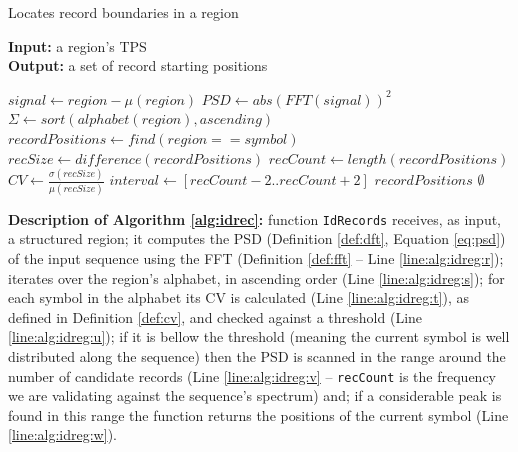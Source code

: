 \vspace{-0.3cm}

\begin{small}
\begin{algorithm}
\caption{\small{Locates record boundaries in a region}}
\label{alg:idrec}
\begin{flushleft}
\textbf{Input:} a region's TPS \\
\textbf{Output:} a set of record starting positions
\end{flushleft}

\begin{algorithmic}[1]

\State $signal \leftarrow region-\mu(region)$ 
\State $PSD \leftarrow abs(FFT(signal))^2$\label{line:alg:idreg:r}
\State $\Sigma \leftarrow sort(alphabet(region), ascending)$
\label{line:alg:idreg:s}
\State $recordPositions \leftarrow find(region == symbol)$
\State $recSize \leftarrow difference(recordPositions)$
\State $recCount \leftarrow length(recordPositions)$
\State $CV \leftarrow
\frac{\sigma(recSize)}{\mu(recSize)}$\label{line:alg:idreg:t}
\label{line:alg:idreg:u}
\State $interval \leftarrow [recCount-2 .. recCount+2]$
\label{line:alg:idreg:v}
\State \Return $recordPositions$\label{line:alg:idreg:w}
\EndIf
\EndIf
\EndFor
\State \Return $\emptyset$
\EndFunction

\end{algorithmic}
\end{algorithm}
\end{small}

\textbf{Description of Algorithm \ref{alg:idrec}:} function \texttt{IdRecords}
receives, as input, a structured region; it computes the PSD (Definition
\ref{def:dft}, Equation \ref{eq:psd}) of the input sequence using the FFT
(Definition \ref{def:fft} -- Line \ref{line:alg:idreg:r}); iterates over the
region's alphabet, in ascending order (Line \ref{line:alg:idreg:s}); for each
symbol in the alphabet its CV is calculated (Line \ref{line:alg:idreg:t}), as
defined in Definition \ref{def:cv}, and checked against a threshold (Line
\ref{line:alg:idreg:u}); if it is bellow the threshold (meaning the current
symbol is well distributed along the sequence) then the PSD is scanned in the
range around the number of candidate records (Line \ref{line:alg:idreg:v} --
\texttt{recCount} is the frequency we are validating against the sequence's
spectrum) and; if a considerable peak is found in this range the function
returns the positions of the current symbol (Line \ref{line:alg:idreg:w}).

